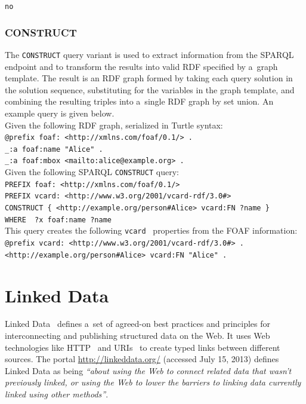 \texttt{no}

\subsubsection{CONSTRUCT}

The \texttt{CONSTRUCT} query variant is used to extract
information from the SPARQL endpoint
and to transform the results into valid RDF
specified by a~graph template.
The result is an RDF graph formed by taking
each query solution in the solution sequence,
substituting for the variables in the graph template,
and combining the resulting triples into
a~single RDF graph by set union.
An example query is given below.\\

\noindent Given the following RDF graph,
serialized in Turtle syntax:\\

\texttt{@prefix foaf: <http://xmlns.com/foaf/0.1/> .}\\
\texttt{\indent \_:a foaf:name "Alice" .}\\
\texttt{\indent \_:a foaf:mbox <mailto:alice@example.org> .}\\

\noindent Given the following SPARQL \texttt{CONSTRUCT} query:\\

\texttt{PREFIX foaf: <http://xmlns.com/foaf/0.1/>}\\
\texttt{\indent PREFIX vcard: <http://www.w3.org/2001/vcard-rdf/3.0\#>}\\
\texttt{\indent CONSTRUCT \{ <http://example.org/person\#Alice> vcard:FN ?name \}}\\
\texttt{\indent WHERE { ?x foaf:name ?name }}\\

\noindent This query creates the following
\texttt{vcard}~\cite{dawson1998vcard}
properties from the FOAF information:\\

\texttt{@prefix vcard: <http://www.w3.org/2001/vcard-rdf/3.0\#> .}\\ 
\texttt{\indent <http://example.org/person\#Alice> vcard:FN "Alice" .}

\section{Linked Data}

Linked Data~\cite{bernerslee2006linkeddata}
defines a~set of agreed-on best practices and
principles for interconnecting and publishing
structured data on the Web.
It uses Web technologies like HTTP~\cite{fielding1999http}
and URIs~\cite{bernerslee2005uri}
to create typed links between different sources.
The portal \url{http://linkeddata.org/} (accessed July 15, 2013)
defines Linked Data as being
\textit{``about using the Web to connect related data that
wasn’t previously linked, or using the Web
to lower the barriers to linking data
currently linked using other methods''}.


